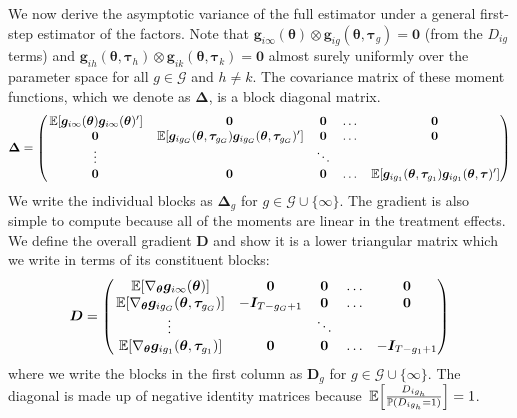 \documentclass[12pt]{article}
\begin{document}
We now derive the asymptotic variance of the full estimator under a general first-step estimator of the factors. Note that $\bm g_{i\infty}(\bm{\theta}) \otimes \bm g_{ig}(\bm{\theta}, \bm \tau_g) = \bm 0$ (from the $D_{ig}$ terms) and $\bm g_{ih}(\bm{\theta}, \bm \tau_h) \otimes \bm g_{ik}(\bm{\theta}, \bm \tau_k) = \bm 0$ almost surely uniformly over the parameter space for all $g \in \mathcal{G}$ and $h \neq k$. The covariance matrix of these moment functions, which we denote as $\bm \Delta$, is a block diagonal matrix.
\begin{equation*}
    \bm \Delta =
    \begin{pmatrix}
        \expec{\bm g_{i \infty}(\bm{\theta}) \bm g_{i \infty}(\bm{\theta})'} & \bm 0 & \bm 0 & \hdots & \bm 0\\
        \bm 0 &  \expec{\bm g_{i g_G}(\bm{\theta}, \bm \tau_{g_G}) \bm g_{i g_G}(\bm{\theta}, \bm \tau_{g_G})' } & \bm 0 & \hdots & \bm 0\\
        \vdots & & \ddots  &\\
        \bm 0 & \bm 0 & \bm 0 & \hdots & \expec{ \bm g_{i g_1}(\bm{\theta}, \bm \tau_{g_1}) \bm g_{i g_1}(\bm{\theta}, \bm \tau)'}
    \end{pmatrix}
\end{equation*}
We write the individual blocks as $\bm \Delta_g$ for $g \in \mathcal{G} \cup \{ \infty \}$. The gradient is also simple to compute because all of the moments are linear in the treatment effects. We define the overall gradient $\bm D$ and show it is a lower triangular matrix which we write in terms of its constituent blocks:
\begin{equation*}
    \bm D = 
    \begin{pmatrix}
        \expec{\nabla_{\bm{\theta}} \bm g_{i\infty}(\bm{\theta}) } & \bm 0 & \bm 0 & \hdots & \bm 0\\
        \expec{\nabla_{\bm{\theta}} \bm g_{ig_G}(\bm{\theta}, \bm \tau_{g_G})} & -\bm I_{T - g_G + 1} & \bm 0 & \hdots & \bm 0\\
        \vdots & & \ddots  &\\
        \expec{\nabla_{\bm{\theta}} \bm g_{ig_1}(\bm{\theta}, \bm \tau_{g_1})} & \bm 0 & \bm 0 & \hdots & -\bm I_{T - g_1 + 1}
    \end{pmatrix}
\end{equation*}
where we write the blocks in the first column as $\bm D_g$ for $g \in \mathcal{G} \cup \{ \infty \}$. The diagonal is made up of negative identity matrices because $\expec{\frac{D_{ig_h}}{\mathbb{P}(D_{ig_h} = 1)}} = 1$.
\end{document}
